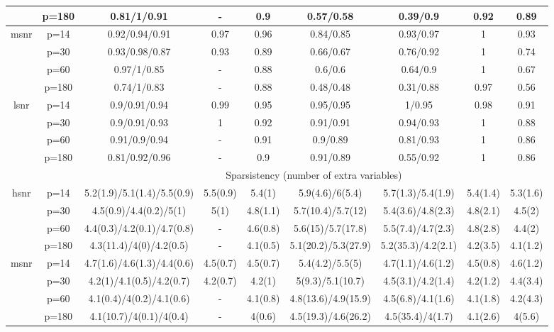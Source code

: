 \begin{table}[ht]
{\begin{tabular}{|c|c|ccccccc|}
   & p=180 & 0.81/1/0.91 & - & 0.9 & 0.57/0.58 & 0.39/0.9 & 0.92 & 0.89 \\ 
  \midrule\multirow{4}[2]{*}{msnr} & p=14 & 0.92/0.94/0.91 & 0.97 & 0.96 & 0.84/0.85 & 0.93/0.97 & 1 & 0.93 \\ 
   & p=30 & 0.93/0.98/0.87 & 0.93 & 0.89 & 0.66/0.67 & 0.76/0.92 & 1 & 0.74 \\ 
   & p=60 & 0.97/1/0.85 & - & 0.88 & 0.6/0.6 & 0.64/0.9 & 1 & 0.67 \\ 
   & p=180 & 0.74/1/0.83 & - & 0.88 & 0.48/0.48 & 0.31/0.88 & 0.97 & 0.56 \\ 
  \midrule\multirow{4}[2]{*}{lsnr} & p=14 & 0.9/0.91/0.94 & 0.99 & 0.95 & 0.95/0.95 & 1/0.95 & 0.98 & 0.91 \\ 
   & p=30 & 0.9/0.91/0.93 & 1 & 0.92 & 0.91/0.91 & 0.94/0.93 & 1 & 0.88 \\ 
   & p=60 & 0.91/0.9/0.94 & - & 0.91 & 0.9/0.89 & 0.81/0.93 & 1 & 0.86 \\ 
   & p=180 & 0.81/0.92/0.96 & - & 0.9 & 0.91/0.89 & 0.55/0.92 & 1 & 0.86 \\ 
   \midrule 
 \multicolumn{1}{|c}{} &       & \multicolumn{7}{c|}{Sparsistency (number of extra variables)} \\
\midrule\multirow{4}[2]{*}{hsnr} & p=14 & 5.2(1.9)/5.1(1.4)/5.5(0.9) & 5.5(0.9) & 5.4(1) & 5.9(4.6)/6(5.4) & 5.7(1.3)/5.4(1.9) & 5.4(1.4) & 5.3(1.6) \\ 
   & p=30 & 4.5(0.9)/4.4(0.2)/5(1) & 5(1) & 4.8(1.1) & 5.7(10.4)/5.7(12) & 5.4(3.6)/4.8(2.3) & 4.8(2.1) & 4.5(2) \\ 
   & p=60 & 4.4(0.3)/4.2(0.1)/4.7(0.8) & - & 4.6(0.8) & 5.6(15)/5.7(17.8) & 5.5(7.4)/4.7(2.3) & 4.8(2.8) & 4.4(2) \\ 
   & p=180 & 4.3(11.4)/4(0)/4.2(0.5) & - & 4.1(0.5) & 5.1(20.2)/5.3(27.9) & 5.2(35.3)/4.2(2.1) & 4.2(3.5) & 4.1(1.2) \\ 
  \midrule\multirow{4}[2]{*}{msnr} & p=14 & 4.7(1.6)/4.6(1.3)/4.4(0.6) & 4.5(0.7) & 4.5(0.7) & 5.4(4.2)/5.5(5) & 4.7(1.1)/4.6(1.2) & 4.5(0.8) & 4.6(1.2) \\ 
   & p=30 & 4.2(1)/4.1(0.5)/4.2(0.7) & 4.2(0.7) & 4.2(1) & 5(9.3)/5.1(10.7) & 4.5(3.1)/4.2(1.4) & 4.2(1.2) & 4.4(3.4) \\ 
   & p=60 & 4.1(0.4)/4(0.2)/4.1(0.6) & - & 4.1(0.8) & 4.8(13.6)/4.9(15.9) & 4.5(6.8)/4.1(1.6) & 4.1(1.8) & 4.2(4.3) \\ 
   & p=180 & 4.1(10.7)/4(0.1)/4(0.4) & - & 4(0.6) & 4.5(19.3)/4.6(26.2) & 4.5(35.4)/4(1.7) & 4.1(2.6) & 4(5.6) \\ 

\end{tabular}}
\end{table}
